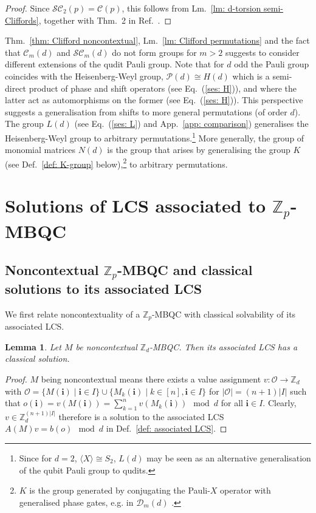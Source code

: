 \documentclass[aps,pra,letterpaper,onrcolumn,nofootinbib,notitlepage,longbibliography]{revtex4-1}
\newtheorem{lemma}{Lemma}
\newcommand{\ra}{\ensuremath{\rightarrow}}
\newcommand{\zz}{\mathbb Z}
\newcommand{\bi}{\mathbf{i}}
\newcommand\mc[1]{\mathcal{#1}}
\newcommand{\cC}{\mc{C}}
\newcommand{\cD}{\mc{D}}
\newcommand{\cP}{\mc{P}}
\newcommand{\SC}{\mc{SC}}
\begin{document}
\begin{proof}
    Since $\SC_2(p)=\cC(p)$, this follows from Lm.~\ref{lm: d-torsion semi-Cliffords}, together with Thm.~2 in Ref.~\cite{FrembsChungOkay2022}.
\end{proof}

Thm.~\ref{thm: Clifford noncontextual}, Lm.~\ref{lm: Clifford permutations} and the fact that $\cC_m(d)$ and $\SC_m(d)$ do not form groups for $m>2$ suggests to consider different extensions of the qudit Pauli group. Note that for $d$ odd the Pauli group coincides with the Heisenberg-Weyl group, $\cP(d)\cong H(d)$ which is a semi-direct product of phase and shift operators (see Eq.~(\ref{ses: H})), and where the latter act as automorphisms on the former (see Eq.~(\ref{ses: H})). This perspective suggests a generalisation from shifts to more general permutations (of order $d$). The group $L(d)$ (see Eq.~(\ref{ses: L}) and App.~\ref{app: comparison}) generalises the Heisenberg-Weyl group to arbitrary permutations.\footnote{Since for $d=2$, $\langle X\rangle\cong S_2$, $L(d)$ may be seen as an alternative generalisation of the qubit Pauli group to qudits.} More generally, the group of monomial matrices $N(d)$ is the group that arises by generalising the group $K$ (see Def.~\ref{def: K-group} below),\footnote{$K$ is the group generated by conjugating the Pauli-$X$ operator with generalised phase gates, e.g. in $\cD_m(d)$ \cite{FrembsRobertsCampbellBartlett2022,FrembsChungOkay2022}.} to arbitrary permutations.



\section{Solutions of LCS associated to $\zz_p$-MBQC}\label{sec: solution}

\subsection{Noncontextual $\zz_p$-MBQC and classical solutions to its associated LCS}

We first relate noncontextuality of a $\zz_p$-MBQC with classical solvability of its associated LCS.

\begin{lemma}\label{lm: classical solutions}
    Let $M$ be noncontextual $\zz_d$-MBQC. Then its associated LCS has a classical solution.
\end{lemma}

\begin{proof}
    $M$ being noncontextual means there exists a value assignment $v:\mc{O}\ra\zz_d$ with $\mc{O}=\{M(\bi)\mid\bi\in I\}\cup\{M_k(\bi)\mid k\in[n],\bi\in I\}$ for $|\mc{O}|=(n+1)|I|$
    such that $o(\bi)=v(M(\bi))=\sum_{k=1}^n v(M_k(\bi))\mod d$ for all $\bi\in I$. Clearly, $v\in\zz^{(n+1)|I|}_d$ therefore is a solution to the associated LCS $A(M)v=b(o)\mod d$ in Def.~\ref{def: associated LCS}.
\end{proof}
\end{document}
